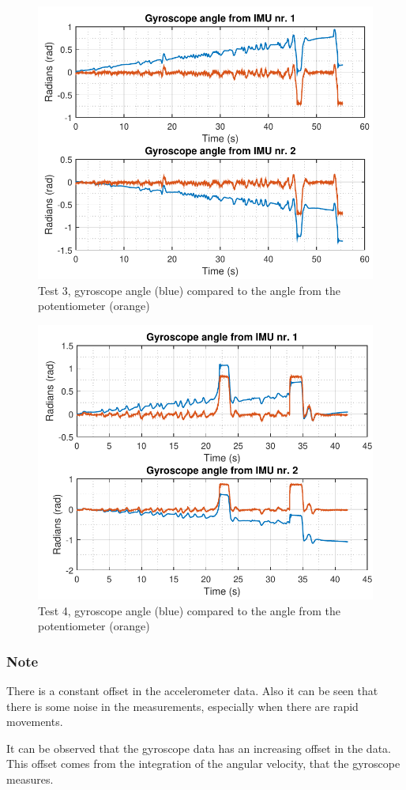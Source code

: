 \begin{figure}[H] 
	\centering 
	\includegraphics[scale=0.8]{figures/gyro3}
	\caption{Test 3, gyroscope angle (blue) compared to the angle from the potentiometer (orange)}
	\label{data3gyro}
\end{figure}
\begin{figure}[H] 
	\centering 
	\includegraphics[scale=0.8]{figures/gyro4}
	\caption{Test 4, gyroscope angle (blue) compared to the angle from the potentiometer (orange)}
	\label{data4gyro}
\end{figure}

\subsubsection{Note}
There is a constant offset in the accelerometer data. Also it can be seen that there is some noise in the measurements, especially when there are rapid movements.

It can be observed that the gyroscope data has an increasing offset in the data. This offset comes from the integration of the angular velocity, that the gyroscope measures.